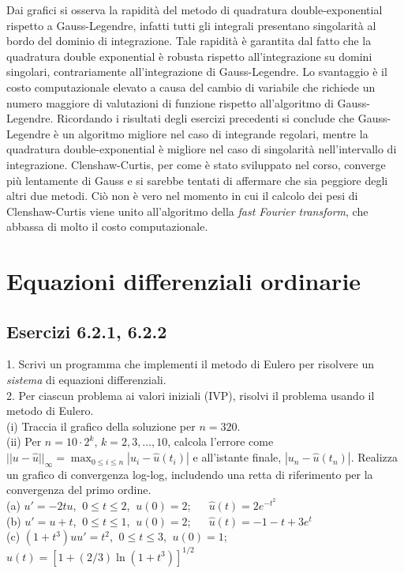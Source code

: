 \documentclass[letterpaper, 12pt]{article}
\numberwithin{equation}{section}    %
\begin{document}
Dai grafici si osserva la rapidità del metodo di quadratura double-exponential rispetto a Gauss-Legendre, 
infatti tutti gli integrali presentano singolarità al bordo del dominio di integrazione. Tale rapidità
è garantita dal fatto che la quadratura double exponential è robusta rispetto all'integrazione su domini singolari,
contrariamente all'integrazione di Gauss-Legendre. Lo svantaggio è il costo computazionale elevato a causa 
del cambio di variabile che richiede un numero
maggiore di valutazioni di funzione rispetto all'algoritmo di Gauss-Legendre. Ricordando i risultati
degli esercizi precedenti si conclude che Gauss-Legendre è un algoritmo migliore nel caso di integrande 
regolari, mentre la quadratura double-exponential è migliore nel caso di singolarità nell'intervallo di 
integrazione. Clenshaw-Curtis, per come è stato sviluppato nel corso, converge più lentamente di Gauss e 
si sarebbe tentati di affermare che sia peggiore degli altri due metodi. Ciò non è vero nel momento in cui
il calcolo dei pesi di Clenshaw-Curtis viene unito all'algoritmo della \textit{fast Fourier transform},
che abbassa di molto il costo computazionale.

\section{Equazioni differenziali ordinarie}
\subsection{Esercizi 6.2.1, 6.2.2}
1. Scrivi un programma che implementi il metodo di Eulero per risolvere un \textit{sistema} 
di equazioni differenziali.\\
2. Per ciascun problema ai valori iniziali (IVP), risolvi il problema usando il metodo di Eulero. \\
(i) Traccia il grafico della soluzione per $n=320$. \\
(ii) Per $n=10\cdot2^k$, $k=2,3,\ldots,10$, calcola l'errore come 
$||u-\hat{u}||_\infty=\max_{0\leq i\leq n} |u_i-\hat{u}(t_i)|$ e all'istante finale, $|u_n-\hat{u}(t_n)|$. 
Realizza un grafico di convergenza log-log, includendo una retta di riferimento per la convergenza del 
primo ordine.\\
(a) $u' = -2t u$, $\ 0 \le t \le 2$, $\ u(0) = 2$;  
$\quad$ $\hat{u}(t) = 2e^{-t^2}$ \\
(b) $u' = u + t$, $\ 0 \le t \le 1$, $\ u(0) = 2$;  
$\quad$ $\hat{u}(t) = -1-t+3e^t$ \\
(c) $(1+t^3)uu' = t^2$, $\ 0 \le t \le 3$, $\ u(0) =1$; 
$\quad$ $\hat{u}(t) = [1+(2/3)\ln (1+t^3)]^{1/2}$
\end{document}
